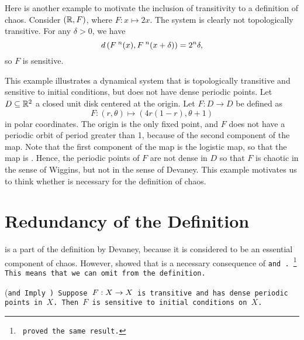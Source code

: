 \documentclass[10pt,draft,twoside]{book}
\begin{document}
\begin{example}
  Here is another example to motivate the inclusion of transitivity to a definition of chaos.
  Consider $(\mathbb{R}, F)$, where $F: x \mapsto 2x$.
  The system is clearly not topologically transitive.
  For any $\delta > 0$, we have
  \begin{equation*}
    d\left( F^{\;n}(x), F^{\;n}(x+\delta) \right) = 2^n \delta,
  \end{equation*}
  so $F$ is sensitive.
\end{example}
\begin{example}
  \citep{martelli}
  This example illustrates a dynamical system that is topologically transitive and sensitive to initial conditions, but does not have dense periodic points.
  Let $D \subseteq \mathbb{R}^2$ a closed unit disk centered at the origin.
  Let $F: D \to D$ be defined as
  \begin{equation*}
    F: (r, \theta) \mapsto (4r(1 - r), \theta + 1)
  \end{equation*}
  in polar coordinates.
  The origin is the only fixed point, and $F$ does not have a periodic orbit of period greater than 1, because of the second component of the map.
  Note that the first component of the map is the logistic map, so that the map is \sdic.
  Hence, the periodic points of $F$ are not dense in $D$ so that $F$ is chaotic in the sense of Wiggins, but not in the sense of Devaney.
  This example motivates us to think whether \dpp is necessary for the definition of chaos.
  \label{eg:notdpp}
\end{example}

\section{Redundancy of the Definition}
\sdic is a part of the definition by Devaney, because it is considered to be an essential component of chaos.
However, \citet{silverman} showed that \sdic is a necessary consequence of \tt and \dpp.
\footnote{\citet{banks} proved the same result.}
This means that we can omit \sdic from the definition.
\begin{theorem}
  (\tt and \dpp Imply \sdic)
  Suppose $F: X\rightarrow X$ is transitive and has dense periodic points in $X$.
  Then $F$ is sensitive to initial conditions on $X$.
  \label{thm:silverman}
\end{theorem}
\end{document}
